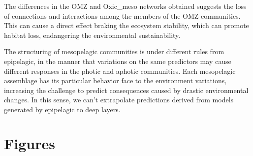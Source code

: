 \documentclass[fleqn,10pt]{wlscirep}
\begin{document}
The differences in the OMZ and Oxic\_meso networks obtained suggests the loss of connections and interactions among the members of the OMZ communities. This can cause a direct effect braking the ecosystem stability, which can promote habitat loss, endangering the environmental sustainability.

The structuring of mesopelagic communities is under different rules from epipelagic, in the manner that variations on the same predictors may cause different responses in the photic and aphotic communities. Each mesopelagic assemblage has its particular behavior face to the environment variations, increasing the challenge to predict consequences caused by drastic environmental changes. In this sense, we can’t extrapolate predictions derived from models generated by epipelagic to deep layers.

\newpage
\section*{Figures}
\end{document}
